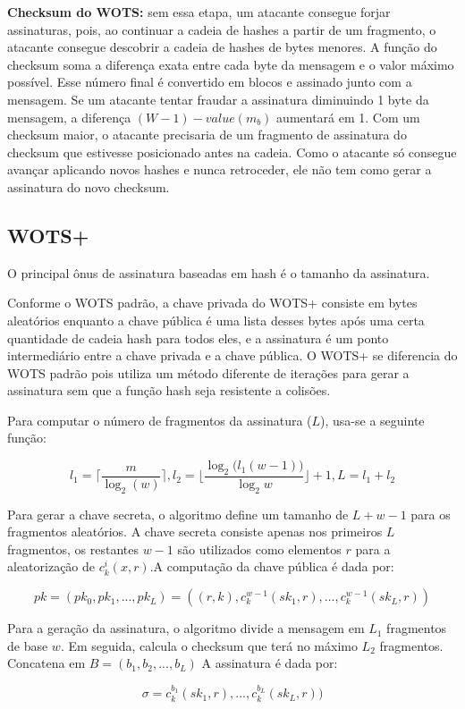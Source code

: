 \documentclass[12pt, a4paper]{report}
\begin{document}
\textbf{Checksum do WOTS:} sem essa etapa, um atacante consegue forjar assinaturas, pois, ao continuar a cadeia de hashes a partir de um fragmento, o atacante consegue descobrir a cadeia de hashes de bytes menores. A função do checksum soma a diferença exata entre cada byte da mensagem e o valor máximo possível. Esse número final é convertido em blocos e assinado junto com a mensagem. Se um atacante tentar fraudar a assinatura diminuindo 1 byte da mensagem, a diferença $(W-1)-value(m_b)$ aumentará em 1. Com um checksum maior, o atacante precisaria de um fragmento de assinatura do checksum que estivesse posicionado antes na cadeia. Como o atacante só consegue avançar aplicando novos hashes e nunca retroceder, ele não tem como gerar a assinatura do novo checksum.

\subsection{WOTS+}
O principal ônus de assinatura baseadas em hash é o tamanho da assinatura.

Conforme o WOTS padrão, a chave privada do WOTS+ consiste em bytes aleatórios enquanto a chave pública é uma lista desses bytes após uma certa quantidade de cadeia hash para todos eles, e a assinatura é um ponto intermediário entre a chave privada e a chave pública. O WOTS+ se diferencia do WOTS padrão pois utiliza um método diferente de iterações para gerar a assinatura sem que a função hash seja resistente a colisões.

Para computar o número de fragmentos da assinatura ($L$), usa-se a seguinte função:

$$l_1= \lceil \frac{m}{\log_2{(w)}} \rceil, l_2 = \lfloor \frac{\log_2{(l_1(w-1)})}{\log_2{w}}\rfloor+1, L = l_1+l_2$$

Para gerar a chave secreta, o algoritmo define um tamanho de $L+w-1$ para os fragmentos aleatórios. A chave secreta consiste apenas nos primeiros $L$ fragmentos, os restantes $w-1$ são utilizados como elementos $r$ para a aleatorização de $c^i_k(x,r)$.A computação da chave pública é dada por:

$$pk=(pk_0,pk_1,...,pk_L)=((r,k),c^{w-1}_k(sk_1,r),...,c^{w-1}_k(sk_L,r))$$

Para a geração da assinatura, o algoritmo divide a mensagem em $L_1$ fragmentos de base $w$. Em seguida, calcula o checksum que terá no máximo $L_2$ fragmentos. Concatena em $B=(b_1, b_2,...,b_L)$ A assinatura é dada por:

$$\sigma = c^{b_1}_k(sk_1,r),...,c^{b_L}_k(sk_L,r))$$
\end{document}
